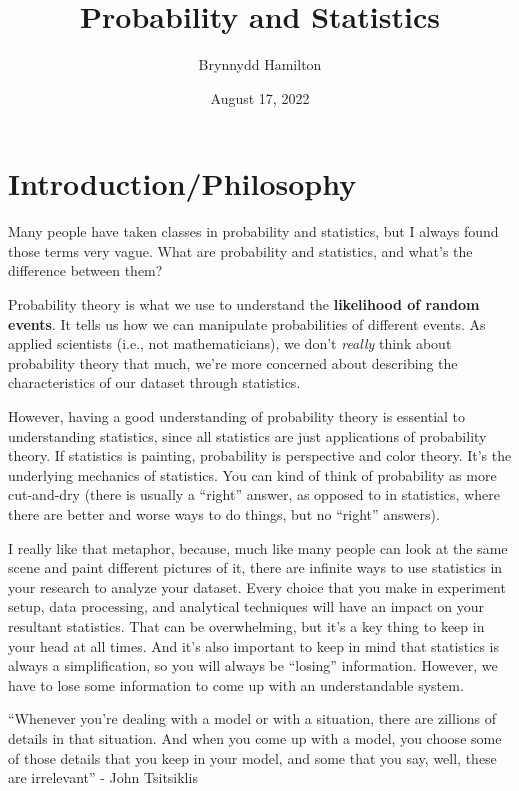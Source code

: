 \documentclass{article}
\title{Probability and Statistics}
\author{Brynnydd Hamilton}
\date{August 17, 2022}
\begin{document}
\tableofcontents

\maketitle

\section{Introduction/Philosophy}
Many people have taken classes in probability and statistics, but I always found those terms very vague. What are probability and statistics, and what's the difference between them?

Probability theory is what we use to understand the \textbf{likelihood of random events}. It tells us how we can manipulate probabilities of different events. As applied scientists (i.e., not mathematicians), we don't \textit{really} think about probability theory that much, we're more concerned about describing the characteristics of our dataset through statistics.

However, having a good understanding of probability theory is essential to understanding statistics, since all statistics are just applications of probability theory. If statistics is painting, probability is perspective and color theory. It's the underlying mechanics of statistics. You can kind of think of probability as more cut-and-dry (there is usually a ``right'' answer, as opposed to in statistics, where there are better and worse ways to do things, but no ``right'' answers).

I really like that metaphor, because, much like many people can look at the same scene and paint different pictures of it, there are infinite ways to use statistics in your research to analyze your dataset. Every choice that you make in experiment setup, data processing, and analytical techniques will have an impact on your resultant statistics. That can be overwhelming, but it's a key thing to keep in your head at all times. And it's also important to keep in mind that statistics is always a simplification, so you will always be ``losing'' information. However, we have to lose some information to come up with an understandable system. 

``Whenever you're dealing with a model or with a situation, there are zillions of details in that situation. And when you come up with a model, you choose some of those details that you keep in your model, and some that you say, well, these are irrelevant'' - John Tsitsiklis
\end{document}
